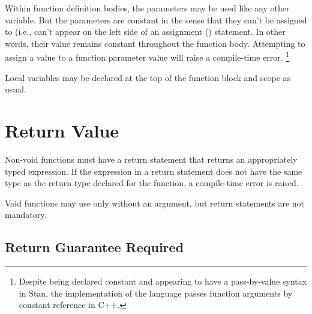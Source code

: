 Within function definition bodies, the parameters may be used like any
other variable.  But the parameters are constant in the sense that
they can't be assigned to (i.e., can't appear on the left side of an
assignment (\code{<-}) statement.  In other words, their value remains
constant throughout the function body.  Attempting to assign a value
to a function parameter value will raise a compile-time error.%
%
\footnote{Despite being declared constant and appearing to have a
  pass-by-value syntax in Stan, the implementation of the language
  passes function arguments by constant reference in C++.}

Local variables may be declared at the top of the function block and
scope as usual.

\section{Return Value}\label{function-returns.section}

Non-void functions must have a return statement that returns an
appropriately typed expression.   If the expression in a return
statement does not have the same type as the return type declared for
the function, a compile-time error is raised.

Void functions may use  only without an argument, but
return statements are not mandatory.

\subsection{Return Guarantee Required}

